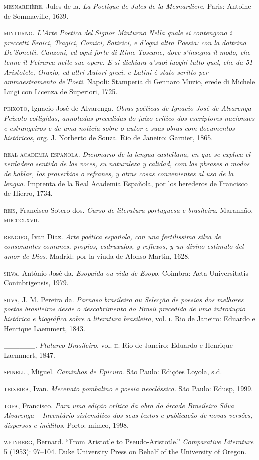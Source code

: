 \begin{Parskip}
\textsc{mesnardière}, Jules de la. \emph{La Poetique de Jules de la Mesnardiere}. Paris: Antoine de Sommaville, 1639.

\textsc{minturno}. \emph{L’Arte Poetica del Signor Minturno Nella quale si
contengono i preccetti Eroici, Tragici, Comici, Satirici, e d’ogni
altra Poesia: con la dottrina De’Sonetti, Canzoni, ed ogni forte
di Rime Toscane, dove s’insegna il modo, che tenne il Petrarca nelle sue opere. E si dichiara a’suoi luoghi tutto quel, che da 51
Aristotele, Orazio, ed altri Autori greci, e Latini è stato scritto
per ammaestramento de’Poeti}. Napoli: Stamperia di Gennaro
Muzio, erede di Michele Luigi con Licenza de Superiori, 1725.

\textsc{peixoto}, Ignacio José de Alvarenga. \emph{Obras poéticas de Ignacio
José de Alvarenga Peixoto colligidas, annotadas precedidas do
juízo crítico dos escriptores nacionaes e estrangeiros e de uma
noticia sobre o autor e suas obras com documentos históricos}, org.
J. Norberto de Souza. Rio de Janeiro: Garnier, 1865.

\textsc{real academia española}. \emph{Dicionario de la lengua castellana,
en que se explica el verdadero sentido de las voces, su naturaleza
y calidad, com las phrases o modos de hablar, los proverbios o
refranes, y otras cosas convenientes al uso de la lengua}. Imprenta
de la Real Academia Española, por los herederos de Francisco
de Hierro, 1734.

\textsc{reis}, Francisco Sotero dos. \emph{Curso de literatura portuguesa e
brasileira}. Maranhão, \textsc{mdccclxvii}.

\textsc{rengifo}, Ivan Diaz. \emph{Arte poética española, con una fertilissima
silva de consonantes comunes, propios, esdruxulos, y reflexos, y
un divino estimulo del amor de Dios}. Madrid: por la viuda de
Alonso Martin, 1628.

\textsc{silva}, António José da. \emph{Esopaida ou vida de Esopo}. Coimbra:
Acta Universitatis Coninbrigensis, 1979.

\textsc{silva}, J. M. Pereira da. \emph{Parnaso brasileiro ou Selecção de poesias
dos melhores poetas brasileiros desde o descobrimento do Brasil
precedida de uma introdução histórica e biográfica sobre a literatura brasileira}, vol. \textsc{i}. Rio de Janeiro: Eduardo e Henrique
Laemmert, 1843.

\_\_\_\_\_\_. \emph{Plutarco Brasileiro}, vol. \textsc{ii}. Rio de Janeiro: Eduardo e
Henrique Laemmert, 1847.

\textsc{spinelli}, Miguel. \emph{Caminhos de Epicuro}. São Paulo: Edições
Loyola, s.d.

\textsc{teixeira}, Ivan. \emph{Mecenato pombalino e poesia neoclássica}. São
Paulo: Edusp, 1999.

\textsc{topa}, Francisco. \emph{Para uma edição crítica da obra do árcade Brasileiro Silva Alvarenga – Inventário sistemático dos seus textos e
publicação de novas versões, dispersos e inéditos}. Porto: mimeo,
1998.

\textsc{weinberg}, Bernard. “From Aristotle to Pseudo-Aristotle.” \emph{Comparative Literature} 5 (1953): 97--104. Duke University Press on
Behalf of the University of Oregon.
\end{Parskip}

